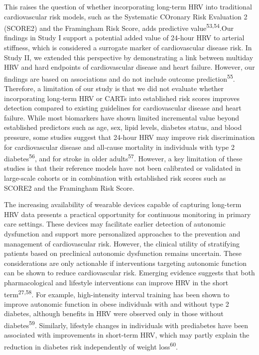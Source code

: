 \documentclass[
  a4paper,
  headsepline=true,
  open=any]{scrbook}
\begin{document}
This raises the question of whether incorporating long-term HRV into
traditional cardiovascular risk models, such as the Systematic COronary
Risk Evaluation 2 (SCORE2) and the Framingham Risk Score, adds
predictive value\textsuperscript{53,54}.Our findings in Study I support
a potential added value of 24-hour HRV to arterial stiffness, which is
considered a surrogate marker of cardiovascular disease risk. In Study
II, we extended this perspective by demonstrating a link between
multiday HRV and hard endpoints of cardiovascular disease and heart
failure. However, our findings are based on associations and do not
include outcome prediction\textsuperscript{55}. Therefore, a limitation
of our study is that we did not evaluate whether incorporating long-term
HRV or CARTs into established risk scores improves detection compared to
existing guidelines for cardiovascular disease and heart failure. While
most biomarkers have shown limited incremental value beyond established
predictors such as age, sex, lipid levels, diabetes status, and blood
pressure, some studies suggest that 24-hour HRV may improve risk
discrimination for cardiovascular disease and all-cause mortality in
individuals with type 2 diabetes\textsuperscript{56}, and for stroke in
older adults\textsuperscript{57}. However, a key limitation of these
studies is that their reference models have not been calibrated or
validated in large-scale cohorts or in combination with established risk
scores such as SCORE2 and the Framingham Risk Score.

The increasing availability of wearable devices capable of capturing
long-term HRV data presents a practical opportunity for continuous
monitoring in primary care settings. These devices may facilitate
earlier detection of autonomic dysfunction and support more personalized
approaches to the prevention and management of cardiovascular risk.
However, the clinical utility of stratifying patients based on
preclinical autonomic dysfunction remains uncertain. These
considerations are only actionable if interventions targeting autonomic
function can be shown to reduce cardiovascular risk. Emerging evidence
suggests that both pharmacological and lifestyle interventions can
improve HRV in the short term\textsuperscript{27,58}. For example,
high-intensity interval training has been shown to improve autonomic
function in obese individuals with and without type 2 diabetes, although
benefits in HRV were observed only in those without
diabetes\textsuperscript{59}. Similarly, lifestyle changes in
individuals with prediabetes have been associated with improvements in
short-term HRV, which may partly explain the reduction in diabetes risk
independently of weight loss\textsuperscript{60}.
\end{document}
